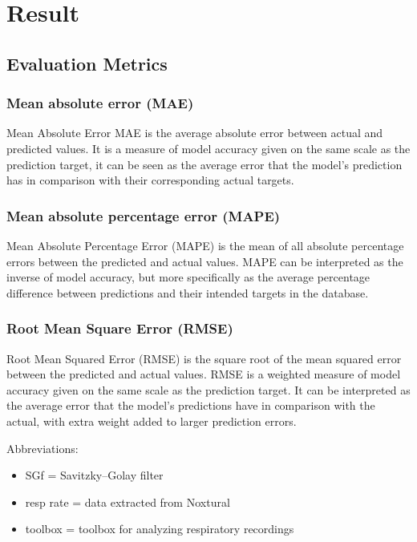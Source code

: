 \chapter{Result}

\section{Evaluation Metrics}
\subsection{Mean absolute error (MAE)}
Mean Absolute Error MAE is the average absolute error between actual and predicted values.  It is a measure of model accuracy given on the same scale as the prediction target, it can be seen as the average error that the model's prediction has in comparison with their corresponding actual targets.


\subsection {Mean absolute percentage error (MAPE)} 
Mean Absolute Percentage Error (MAPE) is the mean of all absolute percentage errors between the predicted and actual values.
MAPE can be interpreted as the inverse of model accuracy, but more specifically as the average percentage difference between predictions and their intended targets in the database.


 \subsection{Root Mean Square Error (RMSE) }
 Root Mean Squared Error (RMSE) is the square root of the mean squared error between the predicted and actual values.
 RMSE is a weighted measure of model accuracy given on the same scale as the prediction target. It can be interpreted as the average error that the model’s predictions have in comparison with the actual, with extra weight added to larger prediction errors.
 
 Abbreviations:
\begin{itemize}
    \item SGf = Savitzky–Golay filter
    \item resp rate = data extracted from Noxtural
    \item toolbox = toolbox for analyzing respiratory recordings %
\end{itemize}

